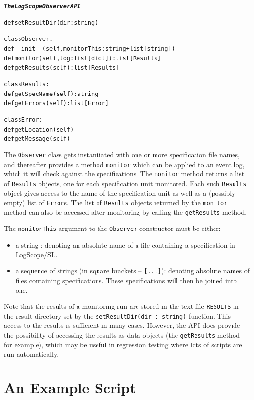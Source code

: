 \documentclass{report}
\newcommand{\logscope}{{\sc LogScope}}
\newcommand{\logscopeSL}{{\sc LogScope/SL}}
\newenvironment{code}[1] %
{
\vspace{0.5cm}
\begin{center}
\begin{Sbox}
\begin{minipage}{11cm}
\begin{alltt}
{\bf\em #1}
}
{
\end{alltt}
\end{minipage}
\end{Sbox}
\setlength{\fboxsep}{8pt}
\fbox{\TheSbox}
\end{center}
\vspace{0.5cm}
}
\begin{document}
\begin{code}{The \logscope{} Observer API}

def setResultDir(dir : string)
	
class Observer:
  def __init__(self,monitorThis : string+list[string])
  def monitor(self,log : list[dict]) : list[Results]
  def getResults(self) : list[Results]
    
class Results:    
  def getSpecName(self) : string
  def getErrors(self) : list[Error]

class Error:
  def getLocation(self)
  def getMessage(self)
\end{code}	    

\noindent The  {\tt Observer} class gets instantiated with one or more specification file names, and thereafter provides a method {\tt monitor} which can be applied to an event log, which it will check against the specifications. The {\tt monitor} method returns a list of {\tt Results}
objects, one for each specification unit monitored. Each such {\tt Results} object gives access to the name of the specification unit as well as a (possibly empty) list of {\tt Error}s.
The list of {\tt Results} objects returned by the {\tt monitor} method can also be accessed
after monitoring by calling the {\tt getResults} method.

\vspace{0.5cm}

\noindent The {\tt monitorThis} argument to the {\tt Observer} constructor must be either:

\begin{itemize}
  \item a string : denoting an absolute name of a file containing a specification in \logscopeSL.
  \item a sequence of strings (in square brackets -- {\tt [...]}): denoting absolute names of files containing specifications. These specifications will then be joined into one. 
\end{itemize}

\noindent Note that the results of a monitoring run are stored in the text file {\tt RESULTS}
in the result directory set by the {\tt setResultDir(dir : string)} function. This access to the results is sufficient in many cases. However, the API does provide the possibility of accessing the results as data objects (the {\tt getResults} method for example), which may
be useful in regression testing where lots of scripts are run automatically.


\section{An Example Script}
\end{document}
